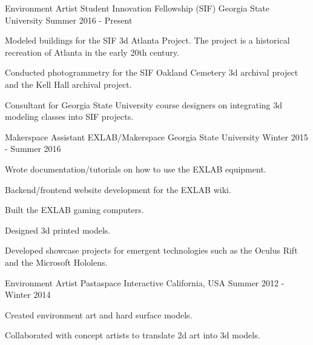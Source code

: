 

\begin{cventries}

  \cventry
    {Environment Artist} %
	{Student Innovation Fellowship (SIF)} %
    {Georgia State University} %
    {Summer 2016 - Present} %
    {
      \begin{cvitems} %
        \item {Modeled buildings for the SIF 3d Atlanta Project. The project is a historical recreation of Atlanta in the early 20th century.}
        \item {Conducted photogrammetry for the SIF Oakland Cemetery 3d archival project and the Kell Hall archival project.}
        \item {Consultant for Georgia State University course designers on integrating 3d modeling classes into SIF projects.}
      \end{cvitems}
    }

  \cventry
    {Makerspace Assistant} %
	{EXLAB/Makerspace} %
    {Georgia State University} %
    {Winter 2015 - Summer 2016} %
    {
      \begin{cvitems} %
        \item {Wrote documentation/tutorials on how to use the EXLAB equipment.}
        \item {Backend/frontend website development for the EXLAB wiki.}
		\item {Built the EXLAB gaming computers.}
		\item {Designed 3d printed models.}
		\item {Developed showcase projects for emergent technologies such as the Oculus Rift and the Microsoft Hololens.}
      \end{cvitems}
    }

  \cventry
	{Environment Artist} %
    {Pastaspace Interactive} %
    {California, USA} %
    {Summer 2012 - Winter 2014} %
    {
      \begin{cvitems} %
        \item {Created environment art and hard surface models.}
		\item {Collaborated with concept artists to translate 2d art into 3d models.}
      \end{cvitems}
    }
\end{cventries}

